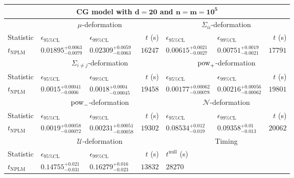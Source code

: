 \begin{tabular}{l|llr|llr}
	\toprule
	\multicolumn{7}{c}{{\bf CG model with $\mathbf{d=20}$ and $\mathbf{n=m=10^{5}}$}} \\
	\toprule
	\multicolumn{1}{c}{} & \multicolumn{3}{c}{$\mu$-deformation} & \multicolumn{3}{c}{$\Sigma_{ii}$-deformation} \\
	Statistic & $\epsilon_{95\%\mathrm{CL}}$ & $\epsilon_{99\%\mathrm{CL}}$ & $t$ (s) & $\epsilon_{95\%\mathrm{CL}}$ & $\epsilon_{99\%\mathrm{CL}}$ & $t$ (s) \\
	\midrule
	$t_{\mathrm{NPLM}}$ & $0.01895_{-0.0079}^{+0.0063}$ & $0.02309_{-0.0063}^{+0.0059}$ & $16247$ & $0.00615_{-0.0027}^{+0.0021}$ & $0.00751_{-0.0021}^{+0.0019}$ & $17791$ \\
	\toprule
	\multicolumn{1}{c}{} & \multicolumn{3}{c}{$\Sigma_{i\neq j}$-deformation} & \multicolumn{3}{c}{$\rm{pow}_{+}$-deformation} \\
	Statistic & $\epsilon_{95\%\mathrm{CL}}$ & $\epsilon_{99\%\mathrm{CL}}$ & $t$ (s) & $\epsilon_{95\%\mathrm{CL}}$ & $\epsilon_{99\%\mathrm{CL}}$ & $t$ (s) \\
	\midrule
	$t_{\mathrm{NPLM}}$ & $0.0015_{-0.0006}^{+0.00041}$ & $0.0018_{-0.00045}^{+0.0004}$ & $19458$ & $0.00177_{-0.00078}^{+0.00062}$ & $0.00216_{-0.00062}^{+0.00056}$ & $19801$ \\
	\toprule
	\multicolumn{1}{c}{} & \multicolumn{3}{c}{$\rm{pow}_{-}$-deformation} & \multicolumn{3}{c}{$\mathcal{N}$-deformation} \\
	Statistic & $\epsilon_{95\%\mathrm{CL}}$ & $\epsilon_{99\%\mathrm{CL}}$ & $t$ (s) & $\epsilon_{95\%\mathrm{CL}}$ & $\epsilon_{99\%\mathrm{CL}}$ & $t$ (s) \\
	\midrule
	$t_{\mathrm{NPLM}}$ & $0.0019_{-0.00072}^{+0.00058}$ & $0.00231_{-0.00058}^{+0.00051}$ & $19302$ & $0.08534_{-0.019}^{+0.012}$ & $0.09358_{-0.013}^{+0.01}$ & $20062$ \\
	\toprule
	\multicolumn{1}{c}{} & \multicolumn{3}{c}{$\mathcal{U}$-deformation} & \multicolumn{3}{c}{Timing} \\
	Statistic & $\epsilon_{95\%\mathrm{CL}}$ & $\epsilon_{99\%\mathrm{CL}}$ & $t$ (s) & $t^{\mathrm{null}}$ (s) \\
	\midrule
	$t_{\mathrm{NPLM}}$ & $0.14755_{-0.031}^{+0.021}$ & $0.16279_{-0.023}^{+0.016}$ & $13832$ & $28270$ \\
	\bottomrule
\end{tabular}